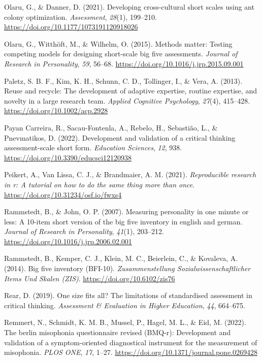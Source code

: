 \documentclass[
  12pt,
  a4paper,
  twoside]{article}
\newlength{\cslhangindent}
\newenvironment{CSLReferences}[2] %
 {\begin{list}{}{%
  \setlength{\itemindent}{0pt}
  \setlength{\leftmargin}{0pt}
  \setlength{\parsep}{0pt}
  \ifodd #1
   \setlength{\leftmargin}{\cslhangindent}
   \setlength{\itemindent}{-1\cslhangindent}
  \fi
  \setlength{\itemsep}{#2\baselineskip}}}
 {\end{list}}
\begin{document}
\begin{CSLReferences}{1}{0}
Olaru, G., \& Danner, D. (2021). Developing cross-cultural short scales using ant colony optimization. \emph{Assessment}, \emph{28}(1), 199--210. \url{https://doi.org/10.1177/1073191120918026}

Olaru, G., Witthöft, M., \& Wilhelm, O. (2015). Methods matter: Testing competing models for designing short-scale big five assessments. \emph{Journal of Research in Personality}, \emph{59}, 56--68. \url{https://doi.org/10.1016/j.jrp.2015.09.001}

Paletz, S. B. F., Kim, K. H., Schunn, C. D., Tollinger, I., \& Vera, A. (2013). Reuse and recycle: The development of adaptive expertise, routine expertise, and novelty in a large research team. \emph{Applied Cognitive Psychology}, \emph{27}(4), 415--428. \url{https://doi.org/10.1002/acp.2928}

Payan Carreira, R., Sacau-Fontenla, A., Rebelo, H., Sebastião, L., \& Pnevmatikos, D. (2022). Development and validation of a critical thinking assessment-scale short form. \emph{Education Sciences}, \emph{12}, 938. \url{https://doi.org/10.3390/educsci12120938}

Peikert, A., Van Lissa, C. J., \& Brandmaier, A. M. (2021). \emph{Reproducible research in r: A tutorial on how to do the same thing more than once}. \url{https://doi.org/10.31234/osf.io/fwxs4}

Rammstedt, B., \& John, O. P. (2007). Measuring personality in one minute or less: A 10-item short version of the big five inventory in english and german. \emph{Journal of Research in Personality}, \emph{41}(1), 203--212. \url{https://doi.org/10.1016/j.jrp.2006.02.001}

Rammstedt, B., Kemper, C. J., Klein, M. C., Beierlein, C., \& Kovaleva, A. (2014). Big five inventory (BFI-10). \emph{Zusammenstellung Sozialwissenschaftlicher Items Und Skalen (ZIS)}. \url{https://doi.org/10.6102/zis76}

Rear, D. (2019). One size fits all? The limitations of standardised assessment in critical thinking. \emph{Assessment \& Evaluation in Higher Education}, \emph{44}, 664--675.

Remmert, N., Schmidt, K. M. B., Mussel, P., Hagel, M. L., \& Eid, M. (2022). The berlin misophonia questionnaire revised (BMQ-r): Development and validation of a symptom-oriented diagnostical instrument for the measurement of misophonia. \emph{PLOS ONE}, \emph{17}, 1--27. \url{https://doi.org/10.1371/journal.pone.0269428}


\end{CSLReferences}
\end{document}
